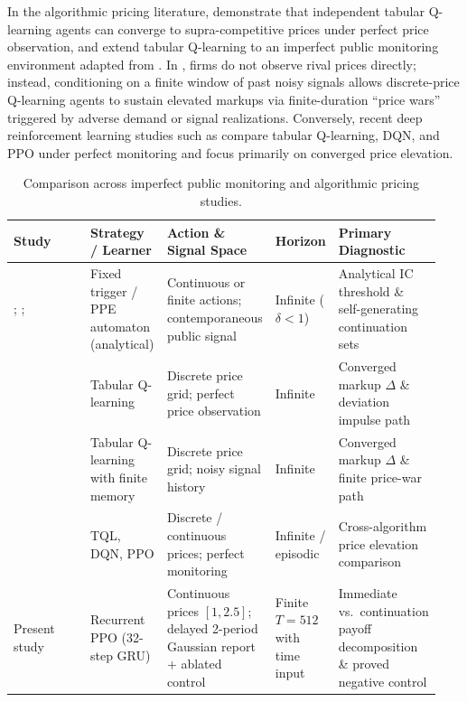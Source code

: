 \documentclass{article}
\begin{document}
In the algorithmic pricing literature, \citet{calvano2020artificial} demonstrate that independent tabular Q-learning agents can converge to supra-competitive prices under perfect price observation, and \citet{calvano2021algorithmic} extend tabular Q-learning to an imperfect public monitoring environment adapted from \citet{green1984noncooperative}. In \citet{calvano2021algorithmic}, firms do not observe rival prices directly; instead, conditioning on a finite window of past noisy signals allows discrete-price Q-learning agents to sustain elevated markups via finite-duration ``price wars'' triggered by adverse demand or signal realizations. Conversely, recent deep reinforcement learning studies such as \citet{deng2025exploring} compare tabular Q-learning, DQN, and PPO under perfect monitoring and focus primarily on converged price elevation.

\begin{table}[t]
\centering
\caption{Comparison across imperfect public monitoring and algorithmic pricing studies.}
\label{tab:lit_comparison}
\footnotesize
\begin{tabular}{@{}p{0.21\linewidth}p{0.18\linewidth}p{0.23\linewidth}p{0.11\linewidth}p{0.21\linewidth}@{}}
\toprule
Study & Strategy / Learner & Action \& Signal Space & Horizon & Primary Diagnostic \\
\midrule
\citet{green1984noncooperative}; \citet{abreu1990toward}; \citet{fudenberg1994folk}
  & Fixed trigger / PPE automaton (analytical)
  & Continuous or finite actions; contemporaneous public signal
  & Infinite ($\delta < 1$)
  & Analytical IC threshold \& self-generating continuation sets \\
\addlinespace[3pt]
\citet{calvano2020artificial}
  & Tabular Q-learning
  & Discrete price grid; perfect price observation
  & Infinite
  & Converged markup $\Delta$ \& deviation impulse path \\
\addlinespace[3pt]
\citet{calvano2021algorithmic}
  & Tabular Q-learning with finite memory
  & Discrete price grid; noisy signal history
  & Infinite
  & Converged markup $\Delta$ \& finite price-war path \\
\addlinespace[3pt]
\citet{deng2025exploring}
  & TQL, DQN, PPO
  & Discrete / continuous prices; perfect monitoring
  & Infinite / episodic
  & Cross-algorithm price elevation comparison \\
\addlinespace[3pt]
Present study
  & Recurrent PPO (32-step GRU)
  & Continuous prices $[1,2.5]$; delayed 2-period Gaussian report + ablated control
  & Finite $T=512$ with time input
  & Immediate vs.\ continuation payoff decomposition \& proved negative control \\
\bottomrule
\end{tabular}
\end{table}
\end{document}
